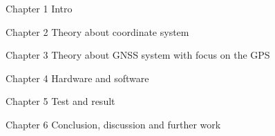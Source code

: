 Chapter 1 Intro

Chapter 2 Theory about coordinate system

Chapter 3 Theory about GNSS system with focus on the GPS

Chapter 4 Hardware and software

Chapter 5 Test and result

Chapter 6 Conclusion, discussion and further work


%
%
%
%
%
%
%
%
%
%
%
%
%
%
%
%
%
%
